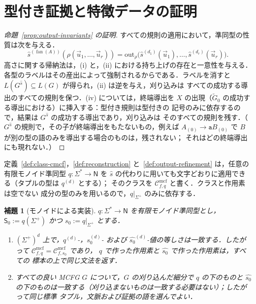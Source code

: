 \documentclass[11pt,a4paper]{ltjsarticle}
\numberwithin{equation}{section}
\theoremstyle{plain}
\newtheorem{lemma}[theorem]{補題}
\theoremstyle{definition}
\theoremstyle{remark}
\newcommand{\Cmcf}[2]{\mathcal{C}^{\mathrm{mcf}}_{#1,#2}}
\newcommand{\out}{\mathrm{out}}
\newcommand{\tuple}[1]{\vec{#1}}
\newcommand{\fan}{\operatorname{fan}}
\theoremstyle{plain}
\begin{document}
\section{型付き証拠と特徴データの証明}
\label{app:typed-witness-aux-proofs}

\begin{proof}[命題~\ref{prop:output-invariants} の証明]
すべての規則の適用において，準同型の性質は次を与える．
\[
 \widehat s^{(\fan(A))}(\rho(\tuple u_1,\ldots,\tuple u_r))=
 \out_\rho\bigl(\widehat s^{(d_1)}(\tuple u_1),\ldots,\widehat s^{(d_r)}(\tuple u_r)\bigr).
\]  高さに関する帰納法は，(i) と，(ii) における持ち上げの存在と一意性を与える．
各型のラベルはその産出によって強制されるからである．ラベルを消すと
$L(G^{\widehat s})\subseteq L(G)$ が得られ，(ii) は逆を与え，刈り込みは
すべての成功する導出のすべての規則を保つ．(iv) については，終端導出を
$X$ の出現（$\widetilde G_0$ の成功する導出における）に挿入する：型付き規則は型付きの
記号のみに依存するので，結果は $G^{\widehat s}$ の成功する導出であり，刈り込みは
そのすべての規則を残す．（$G^{\widehat s}$ の規則で，その子が終端導出をもたないもの，例えば
$A_{(0)}\to\mathtt aB_{(0)}$ で $B$ が別の型の語のみを導出する場合のものは，残されない；
それはどの終端導出にも現れない．）
\end{proof}

定義~\ref{def:class-cmcf}，\ref{def:reconstruction}
と~\ref{def:output-refinement} は，任意の有限モノイド準同型
$q:\Sigma^*\to\mathsf N$ を $\widehat s$ の代わりに用いても文字どおりに適用できる（タプルの型は $q^{(d)}$ とする）；
そのクラスを $\Cmcf{f}{q}$ と書く．クラスと作用素は空でない
成分の型のみを用いるので，$q|_{\Sigma^+}$ のみに依存する．

\begin{lemma}[モノイドによる実装]
\label{lem:semigroup-transfer}
$q:\Sigma^*\to \mathsf N$ を有限モノイド準同型とし，$\mathsf S_0:=q(\Sigma^+)$ かつ
$s_0:=q|_{\Sigma^+}$ とする．
\begin{enumerate}[label=\textup{(\roman*)}]
\item $(\Sigma^+)^d$ 上で，$q^{(d)}$-，$s_0^{(d)}$- および
$\widehat{s_0}^{(d)}$-値の等しさは一致する．したがって $\Cmcf{f}{q}=\Cmcf{f}{s_0}$ であり，
$q$ で作った作用素と $\widehat{s_0}$ で作った作用素は，すべての
標本の上で同じ文法を返す．
\item すべての良い MCFG $G$ について，$G$ の刈り込んだ細分で $q$ の下のものと
$\widehat{s_0}$ の下のものは一致する（刈り込まないものは一致する必要はない）；したがって同じ標準
タプル，文脈および証拠の語を選んでよい．
\end{enumerate}
\end{lemma}
\end{document}
